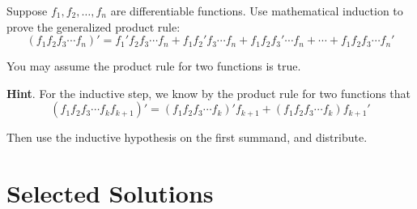 \documentclass[10pt,]{book}
\theoremstyle{plain}
\theoremstyle{definition}
\theoremstyle{definition}
\theoremstyle{definition}
\theoremstyle{definition}
\numberwithin{equation}{chapter}
\begin{document}
\begin{divisionexercise}{23}\hypertarget{exercise-278}{}
\hypertarget{p-2335}{}%
Suppose \(f_1, f_2, \ldots, f_n\) are differentiable functions. Use mathematical induction to prove the generalized product rule:%
\begin{equation*}
(f_1 f_2 f_3 \cdots f_n)' = f_1' f_2 f_3 \cdots f_n + f_1 f_2' f_3 \cdots f_n + f_1 f_2 f_3' \cdots f_n + \cdots + f_1 f_2 f_3 \cdots f_n'
\end{equation*}
%
\par
\hypertarget{p-2336}{}%
You may assume the product rule for two functions is true.%
\par\smallskip%
\noindent\textbf{Hint}.\hypertarget{hint-98}{}\quad%
\hypertarget{p-2337}{}%
For the inductive step, we know by the product rule for two functions that%
\begin{equation*}
(f_1f_2f_3 \cdots f_k f_{k+1})' = (f_1f_2f_3\cdots f_k)'f_{k+1} + (f_1f_2f_3\cdots f_k)f_{k+1}'
\end{equation*}
%
\par
\hypertarget{p-2338}{}%
Then use the inductive hypothesis on the first summand, and distribute.%
\end{divisionexercise}%
\typeout{************************************************}
\typeout{************************************************}
\chapter[{Selected Solutions}]{Selected Solutions}\label{appendix-3}
\end{document}
